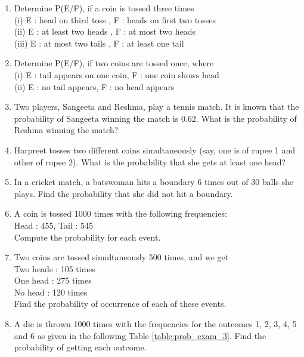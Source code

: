\begin{enumerate}[label=\thesection.\arabic*.,ref=\thesection.\theenumi]
\item Determine P(E/F), if a coin is tossed three times\\
(i) E : head on third toss , F : heads on first two tosses\\
(ii) E : at least two heads , F : at most two heads\\
(iii) E : at most two tails , F : at least one tail\\

\item Determine P(E/F), if two coins are tossed once, where\\
(i) E : tail appears on one coin, F : one coin shows head\\
(ii) E : no tail appears, F : no head appears\\
\item Two players, Sangeeta and Reshma, play a tennis match. It is known
that the probability of Sangeeta winning the match is 0.62. What is the probability of
Reshma winning the match?
\item Harpreet tosses two different coins simultaneously (say, one is of rupee 1
and other of rupee 2). What is the probability that she gets at least one head?

	\item In a cricket match, a batswoman hits a boundary 6 times out of 30 balls she plays. Find the probability that she did not hit a boundary.
\\
\solution

	\item A coin is tossed 1000 times with the following frequencies:\\
Head : 455, Tail : 545\\
Compute the probability for each event.\\
\solution

   \item Two coins are tossed simultaneously 500 times, and we get\\
       Two heads : 105 times\\
       One head : 275 times\\
       No head : 120 times\\
Find the probability of occurrence of each of these events.\\
\solution

   \item A die is thrown 1000 times with the frequencies for the outcomes 1, 2, 3, 4, 5 and 6 as given in the following Table \ref{table:prob_exam_3}.
Find the probability of getting each outcome.


\end{enumerate}
